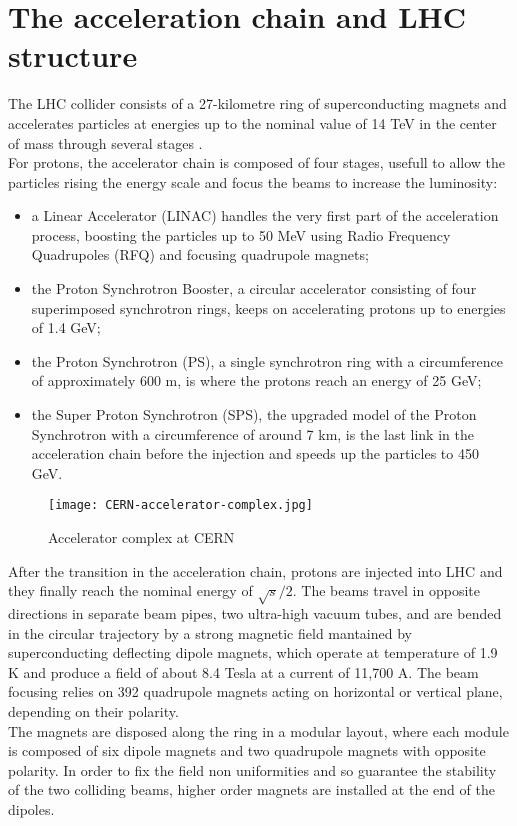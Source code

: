 \section{The acceleration chain and LHC structure}
The LHC collider consists of a 27-kilometre ring of superconducting magnets and accelerates particles at energies up to the nominal value of 14 TeV in the center of mass through several stages \cite{Bruning}.
\\
For protons, the accelerator chain is composed of four stages, usefull to allow the particles rising the energy scale and focus the beams to increase the luminosity:
\begin{itemize}
\item a Linear Accelerator (LINAC) handles the very first part of the acceleration process, boosting the particles up to 50 MeV using Radio Frequency Quadrupoles (RFQ) and focusing quadrupole magnets;
\item the  Proton Synchrotron Booster, a circular accelerator consisting of four superimposed synchrotron rings, keeps on accelerating protons up to energies of 1.4 GeV;
\item the Proton Synchrotron (PS), a single synchrotron ring with a circumference of approximately 600 m, is where the protons reach an energy of 25 GeV;
\item the Super Proton Synchrotron (SPS), the upgraded model of the Proton Synchrotron with a  circumference of around 7 km, is the last link in the acceleration chain before the injection and speeds up the particles to 450 GeV.
\end{itemize} 
\begin{figure}[t]
\centering
\texttt{[image: CERN-accelerator-complex.jpg]}
\caption{Accelerator complex at CERN}
\end{figure}
After the transition in the acceleration chain, protons are injected into LHC and they finally reach the nominal energy of $\sqrt{s}/2$. The beams travel in opposite directions in separate beam pipes, two ultra-high vacuum tubes, and are bended in the circular trajectory by a strong magnetic field mantained by superconducting deflecting dipole magnets, which operate at temperature of 1.9 K and produce a field of about 8.4 Tesla at a current of 11,700 A. The beam focusing relies on 392 quadrupole magnets acting on horizontal or vertical plane, depending on their polarity.
\\
The magnets are disposed along the ring in a modular layout, where each module is composed of six dipole magnets and two quadrupole magnets with opposite polarity. In order to fix the field non uniformities and so guarantee the stability of the two colliding beams, higher order magnets are installed at the end of the dipoles.

